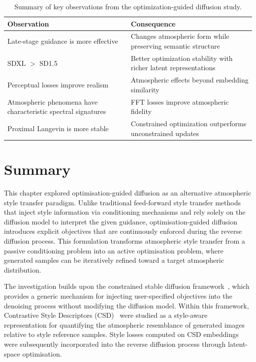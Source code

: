 \begin{table}[htbp]
\centering
\caption{Summary of key observations from the optimization-guided diffusion study.}
\label{tab:chapter7_findings}
\renewcommand{\arraystretch}{1.3}
\begin{tabular}{p{5.5cm} p{7.5cm}}
\toprule
\textbf{Observation} & \textbf{Consequence} \\
\midrule
Late-stage guidance is more effective & Changes atmospheric form while preserving semantic structure \\
SDXL $>$ SD1.5 & Better optimization stability with richer latent representations \\
Perceptual losses improve realism & Atmospheric effects beyond embedding similarity \\
Atmospheric phenomena have characteristic spectral signatures & FFT losses improve atmospheric fidelity \\
Proximal Langevin is more stable & Constrained optimization outperforms unconstrained updates \\
\bottomrule
\end{tabular}
\end{table}

\FloatBarrier
\section{Summary}
\label{sec:ch7_summary}

This chapter explored optimisation-guided diffusion as an alternative atmospheric style transfer paradigm. Unlike traditional feed-forward style transfer methods that inject style information via conditioning mechanisms and rely solely on the diffusion model to interpret the given guidance, optimisation-guided diffusion introduces explicit objectives that are continuously enforced during the reverse diffusion process. This formulation transforms atmospheric style transfer from a passive conditioning problem into an active optimisation problem, where generated samples can be iteratively refined toward a target atmospheric distribution.

The investigation builds upon the constrained stable diffusion framework~\cite{zampini2025constrained}, which provides a generic mechanism for injecting user-specified objectives into the denoising process without modifying the diffusion model. Within this framework, Contrastive Style Descriptors (CSD)~\cite{somepalli2024csd} were studied as a style-aware representation for quantifying the atmospheric resemblance of generated images relative to style reference samples. Style losses computed on CSD embeddings were subsequently incorporated into the reverse diffusion process through latent-space optimisation.

